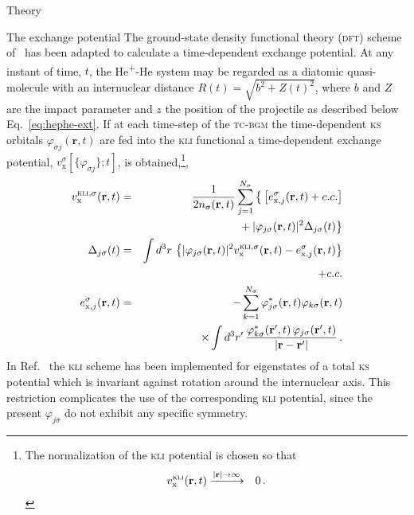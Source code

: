 \documentclass[aps, pra, reprint, groupedaddress, amsfonts, longbibliography,
               amsmath, amssymb, showpacs, nofootinbib]{revtex4-1}
\begin{document}
\begin{section}{Theory \label{sec:theory}}
\begin{subsection}{The exchange potential \label{sec:xpot}}
      The ground-state density functional theory (\textsc{dft}) scheme of~\cite{diamol} has been adapted
      to calculate a time-dependent exchange potential. At any instant of time, $t$, the
      He\textsuperscript{+}-He system may be regarded as a diatomic quasi-molecule with an internuclear
      distance $R(t) = \sqrt{b^2 + Z(t)^2}$, where $b$ and $Z$ are the impact parameter and $z$ the
      position of the projectile as described below Eq.~\eqref{eq:hephe-ext}. If at each
      time-step of the \textsc{tc-bgm} the time-dependent \textsc{ks} orbitals
      $\varphi_{\sigma j}(\mathbf{r},t)$ are fed into the \textsc{kli} functional
      a time-dependent exchange potential, $v^{\sigma}_\mathrm{x}[ \{ \varphi_{\sigma j} \};t]$,
      is obtained,\footnote{The normalization of the \textsc{kli} potential is chosen so that
      \begin{eqnarray}
         v_\mathrm{x}^\textsc{kli}(\mathbf{r},t)
         &\xrightarrow{\vert\mathbf{r}\vert\to\infty} & 0 \label{eq:normvxkli}
         \,.
      \end{eqnarray}
      },
      \begin{eqnarray}
         v_\mathrm{x}^{\textsc{kli},\sigma}(\mathbf{r}, t)
         &=&
         \frac{1}{2n_\sigma(\mathbf{r},t)}
         \sum_{j=1}^{N_\sigma}
         \big\lbrace
         \left\lbrack
         e_{\mathrm{x},j}^\sigma(\mathbf{r},t) + c.c.
         \right\rbrack
         \nonumber \\
         &&\hphantom{\frac{1}{2n_\sigma(\mathbf{r},t)} \sum_{j=1}^{N_\sigma}} +
         \vert\varphi_{j\sigma}(\mathbf{r},t)\vert^2
         \Delta_{j\sigma}(t)
         \big\rbrace
         \label{eq:vxkli} \\
         \Delta_{j\sigma}(t)
         &=& \int d^3r\,
         \left\lbrace
         \vert\varphi_{j\sigma}(\mathbf{r},t)\vert^2 v_\mathrm{x}^{\textsc{kli},\sigma}(\mathbf{r},t)
         - e_{\mathrm{x},j}^\sigma(\mathbf{r},t)
         \right\rbrace
         \nonumber
         \\
         &&
         + c.c.
         \label{eq:deltavxkli}
         \\
         e_{\mathrm{x},j}^\sigma(\mathbf{r},t)
         &=& -
         \sum_{k=1}^{N_\sigma}
         \varphi_{j\sigma}^\ast(\mathbf{r},t)
         \varphi_{k\sigma}(\mathbf{r},t)
         \nonumber
         \\
         &&\times
         \int d^3r'\,
         \frac{\varphi_{k\sigma}^\ast(\mathbf{r}',t)\,\varphi_{j\sigma}(\mathbf{r}',t)}
            {\vert\mathbf{r}-\mathbf{r}'\vert}
         \,.
      \end{eqnarray}
      In Ref.~\cite{diamol} the \textsc{kli} scheme has been implemented for
      eigenstates of a total \textsc{ks} potential which is invariant against
      rotation around the internuclear axis.
      This restriction complicates the use of the corresponding \textsc{kli}
      potential, since the present $\varphi_{j \sigma}$ do not exhibit any specific symmetry.


\end{subsection}
\end{section}
\end{document}
